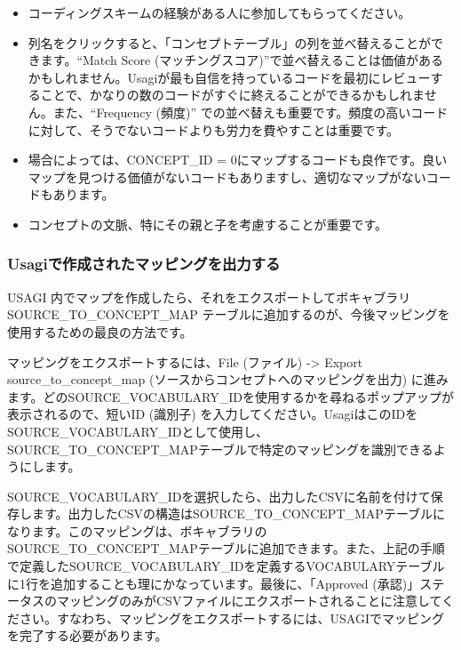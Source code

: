 \documentclass[
  11pt]{book}
\providecommand{\tightlist}{%
  \setlength{\itemsep}{0pt}\setlength{\parskip}{0pt}}
\theoremstyle{definition}
\theoremstyle{definition}
\theoremstyle{definition}
\theoremstyle{definition}
\theoremstyle{remark}
\begin{document}
\begin{itemize}
\tightlist
\item
  コーディングスキームの経験がある人に参加してもらってください。
\item
  列名をクリックすると、「コンセプトテーブル」の列を並べ替えることができます。``Match Score (マッチングスコア)''で並べ替えることは価値があるかもしれません。Usagiが最も自信を持っているコードを最初にレビューすることで、かなりの数のコードがすぐに終えることができるかもしれません。また、``Frequency (頻度)'' での並べ替えも重要です。頻度の高いコードに対して、そうでないコードよりも労力を費やすことは重要です。
\item
  場合によっては、CONCEPT\_ID = 0にマップするコードも良作です。良いマップを見つける価値がないコードもありますし、適切なマップがないコードもあります。
\item
  コンセプトの文脈、特にその親と子を考慮することが重要です。
\end{itemize}

\subsubsection*{Usagiで作成されたマッピングを出力する}\label{usagiux3067ux4f5cux6210ux3055ux308cux305fux30deux30c3ux30d4ux30f3ux30b0ux3092ux51faux529bux3059ux308b}

USAGI 内でマップを作成したら、それをエクスポートしてボキャブラリ SOURCE\_TO\_CONCEPT\_MAP テーブルに追加するのが、今後マッピングを使用するための最良の方法です。

マッピングをエクスポートするには、File (ファイル) -\textgreater{} Export source\_to\_concept\_map (ソースからコンセプトへのマッピングを出力) に進みます。どのSOURCE\_VOCABULARY\_IDを使用するかを尋ねるポップアップが表示されるので、短いID (識別子) を入力してください。UsagiはこのIDをSOURCE\_VOCABULARY\_IDとして使用し、SOURCE\_TO\_CONCEPT\_MAPテーブルで特定のマッピングを識別できるようにします。

SOURCE\_VOCABULARY\_IDを選択したら、出力したCSVに名前を付けて保存します。出力したCSVの構造はSOURCE\_TO\_CONCEPT\_MAPテーブルになります。このマッピングは、ボキャブラリのSOURCE\_TO\_CONCEPT\_MAPテーブルに追加できます。また、上記の手順で定義したSOURCE\_VOCABULARY\_IDを定義するVOCABULARYテーブルに1行を追加することも理にかなっています。最後に、「Approved (承認)」ステータスのマッピングのみがCSVファイルにエクスポートされることに注意してください。すなわち、マッピングをエクスポートするには、USAGIでマッピングを完了する必要があります。
\end{document}
